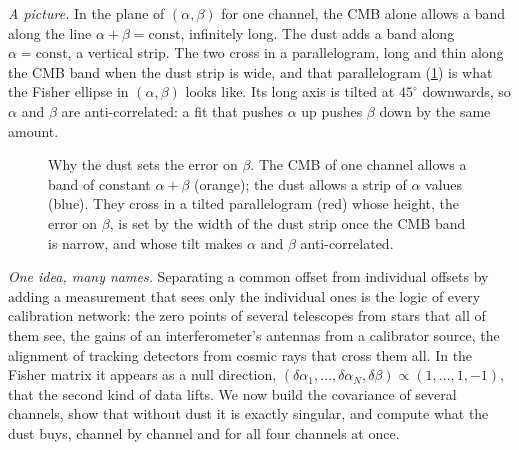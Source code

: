 \emph{A picture.} In the plane of $(\alpha,\beta)$ for one channel, the CMB alone allows a band along the line
$\alpha+\beta=\text{const}$, infinitely long. The dust adds a band along $\alpha=\text{const}$, a vertical strip. The
two cross in a parallelogram, long and thin along the CMB band when the dust strip is wide, and that parallelogram
(\cref{10c:fig:band-strip}) is what the Fisher ellipse in $(\alpha,\beta)$ looks like. Its long axis is tilted at $45^\circ$ downwards, so $\alpha$ and $\beta$ are
anti-correlated: a fit that pushes $\alpha$ up pushes $\beta$ down by the same amount.

\begin{figure}[htbp]
\centering
{}
\caption{Why the dust sets the error on $\beta$. The CMB of one channel allows a band of constant $\alpha+\beta$ (orange);
the dust allows a strip of $\alpha$ values (blue). They cross in a tilted parallelogram (red) whose height, the
error on $\beta$, is set by the width of the dust strip once the CMB band is narrow, and whose tilt makes $\alpha$
and $\beta$ anti-correlated.}
\label{10c:fig:band-strip}
\end{figure}

\emph{One idea, many names.} Separating a common offset from individual offsets by adding a measurement that sees
only the individual ones is the logic of every calibration network: the zero points of several telescopes from
stars that all of them see, the gains of an interferometer's antennas from a calibrator source, the alignment of
tracking detectors from cosmic rays that cross them all. In the Fisher matrix it appears as a null direction,
$(\delta\alpha_1,\dots,\delta\alpha_N,\delta\beta)\propto(1,\dots,1,-1)$, that the second kind of data lifts. We now
build the covariance of several channels, show that without dust it is exactly singular, and compute what the
dust buys, channel by channel and for all four channels at once.

